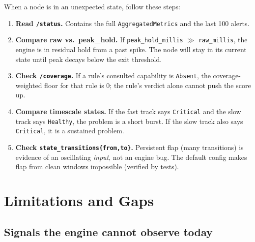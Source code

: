 \documentclass[11pt]{article}
\begin{document}
When a node is in an unexpected state, follow these steps:

\begin{enumerate}
  \item \textbf{Read \texttt{/status}.} Contains the full
        \texttt{AggregatedMetrics} and the last 100 alerts.
  \item \textbf{Compare raw vs.\ peak\_hold.} If
        \texttt{peak\_hold\_millis} $\gg$ \texttt{raw\_millis}, the engine
        is in residual hold from a past spike. The node will stay in its
        current state until peak decays below the exit threshold.
  \item \textbf{Check \texttt{/coverage}.} If a rule's consulted capability
        is \texttt{Absent}, the coverage-weighted floor for that rule is 0;
        the rule's verdict alone cannot push the score up.
  \item \textbf{Compare timescale states.} If the fast track says
        \texttt{Critical} and the slow track says \texttt{Healthy}, the
        problem is a short burst. If the slow track also says
        \texttt{Critical}, it is a sustained problem.
  \item \textbf{Check \texttt{state\_transitions\{from,to\}}.} Persistent
        flap (many transitions) is evidence of an oscillating \emph{input},
        not an engine bug. The default config makes flap from clean windows
        impossible (verified by tests).
\end{enumerate}


\section{Limitations and Gaps}
\label{sec:limitations}

\subsection{Signals the engine cannot observe today}
\end{document}
